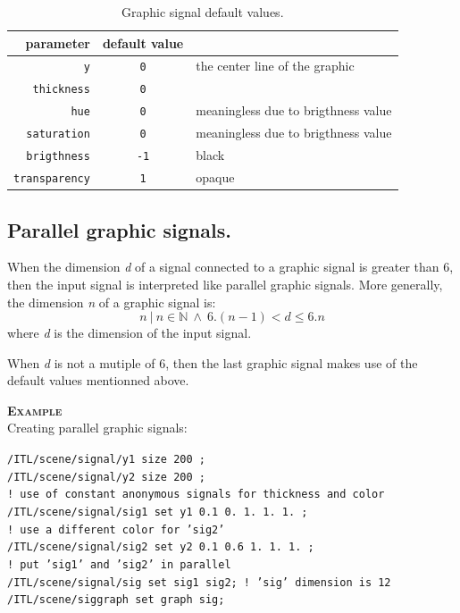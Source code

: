 \documentclass[a4paper,twoside]{report}
\newcommand{\subsublevel}[1]	{\subsection{#1}}
\newcommand{\OSC}[1]		{\texttt{#1}}
\newcommand{\example}		{\textbf{\hspace{-1.5cm}\textbf{\textsc{Example }}}}
\newcommand{\sample}	[1]			{\vspace{-2mm}\begin{center}\colorbox{mygrey}{
								\begin{minipage}[t]{0.9\columnwidth} 
								{\small \texttt{#1}}
								\end{minipage}}\end{center}}
\begin{document}
\begin{table}[htbp]
\caption{Graphic signal default values.}
\begin{center}
\begin{tabular}{|r|cl|}
\hline
parameter & default value & \\
\hline
\OSC{y}					& \OSC{0} & the center line of the graphic \\
\OSC{thickness}		& \OSC{0} & \\
\OSC{hue}				& \OSC{0} & meaningless due to brigthness value \\
\OSC{saturation}		& \OSC{0} & meaningless due to brigthness value \\
\OSC{brigthness}		& \OSC{-1} & black \\
\OSC{transparency}		& \OSC{1} & opaque \\
\hline
\end{tabular}
\end{center}
\label{gsigdefault}
\end{table}

\subsublevel{Parallel graphic signals.}
\label{pgsignal}
When the dimension \textit{d} of a signal connected to a graphic signal is greater than 6, then the input signal is interpreted like parallel graphic signals. More generally, the dimension \textit{n} of a graphic signal is:
\[
n  \  |\ n \in \mathbb{N}\ \land\ 6.(n-1) < d \leqslant 6.n
\]
where \textit{d} is the dimension of the input signal.

When \textit{d} is not a mutiple of 6, then the last graphic signal makes use of the default values mentionned above.

 
\example \\
Creating parallel graphic signals:
\sample{/ITL/scene/signal/y1 size 200 ; \\
/ITL/scene/signal/y2 size 200 ; \\
! use of constant anonymous signals for thickness and color\\
/ITL/scene/signal/sig1 set y1 0.1 0. 1. 1. 1. ; \\
! use a different color for 'sig2'\\
/ITL/scene/signal/sig2 set y2 0.1 0.6 1. 1. 1. ; \\
! put 'sig1' and 'sig2' in parallel\\
/ITL/scene/signal/sig set sig1 sig2;    \hspace{1CM}! 'sig' dimension is 12\\
/ITL/scene/siggraph set graph sig; 
}
\end{document}
